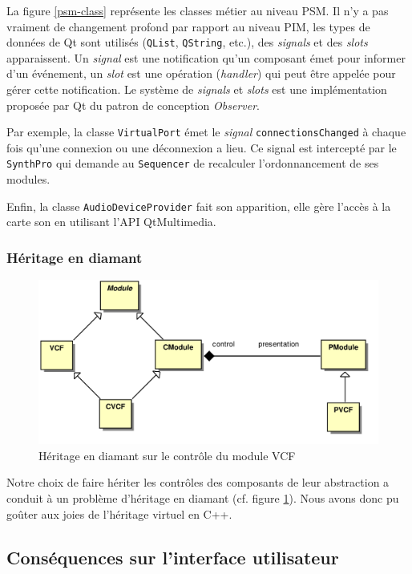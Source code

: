 La figure \ref{psm-class} représente les classes métier au niveau PSM. Il n'y a
pas vraiment de changement profond par rapport au niveau PIM, les
types de données de Qt sont utilisés (\verb!QList!, \verb!QString!,
etc.), des \emph{signals} et des \emph{slots} apparaissent. Un
\emph{signal} est une notification qu'un composant émet pour
informer d'un événement, un \emph{slot} est une opération
(\emph{handler}) qui peut être appelée pour gérer cette
notification. Le système de \emph{signals} et \emph{slots} est une
implémentation proposée par Qt du patron de conception
\emph{Observer}.

Par exemple, la classe \verb!VirtualPort! émet le \emph{signal}
\verb!connectionsChanged! à chaque fois qu'une connexion ou une
déconnexion a lieu. Ce signal est intercepté par le \verb!SynthPro!
qui demande au \verb!Sequencer! de recalculer l'ordonnancement de
ses modules.

Enfin, la classe \verb!AudioDeviceProvider! fait son apparition,
elle gère l'accès à la carte son en utilisant l'API QtMultimedia.

\subsubsection{Héritage en diamant}

\begin{figure}[ht]
\centering
\includegraphics[width=12cm]{../img/ps/pacmodule-psm.pdf}
\caption{Héritage en diamant sur le contrôle du module VCF}
\label{fig:diamond-problem}
\end{figure}

Notre choix de faire hériter les contrôles des composants de leur
abstraction a conduit à un problème d'héritage en diamant (cf. figure \ref{fig:diamond-problem}). Nous
avons donc pu goûter aux joies de l'héritage virtuel en C++.

\subsection{Conséquences sur l'interface utilisateur}

